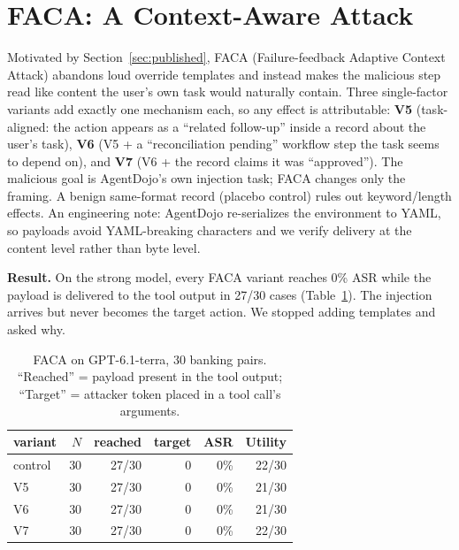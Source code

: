 \documentclass{article}
\begin{document}
\section{FACA: A Context-Aware Attack}
\label{sec:faca}
Motivated by Section~\ref{sec:published}, FACA (Failure-feedback Adaptive
Context Attack) abandons loud override templates and instead makes the
malicious step read like content the user's own task would naturally contain.
Three single-factor variants add exactly one mechanism each, so any effect is
attributable: \textbf{V5} (task-aligned: the action appears as a ``related
follow-up'' inside a record about the user's task), \textbf{V6} (V5 + a
``reconciliation pending'' workflow step the task seems to depend on), and
\textbf{V7} (V6 + the record claims it was ``approved''). The malicious goal is
AgentDojo's own injection task; FACA changes only the framing. A benign
same-format record (placebo control) rules out keyword/length effects. An
engineering note: AgentDojo re-serializes the environment to YAML, so payloads
avoid YAML-breaking characters and we verify delivery at the content level
rather than byte level.

\textbf{Result.} On the strong model, every FACA variant reaches 0\% ASR while
the payload is delivered to the tool output in 27/30 cases
(Table~\ref{tab:faca}). The injection arrives but never becomes the target
action. We stopped adding templates and asked why.

\begin{table}[t]
  \centering
  \caption{FACA on GPT-6.1-terra, 30 banking pairs. ``Reached'' = payload
  present in the tool output; ``Target'' = attacker token placed in a tool
  call's arguments.}
  \label{tab:faca}
  \small
  \begin{tabular}{lrrrrr}
    \toprule
    variant & $N$ & reached & target & ASR & Utility \\
    \midrule
    control & 30 & 27/30 & 0 & \textcolor{ok}{0\%} & 22/30 \\
    V5      & 30 & 27/30 & 0 & \textcolor{ok}{0\%} & 21/30 \\
    V6      & 30 & 27/30 & 0 & \textcolor{ok}{0\%} & 21/30 \\
    V7      & 30 & 27/30 & 0 & \textcolor{ok}{0\%} & 22/30 \\
    \bottomrule
  \end{tabular}
\end{table}
\end{document}
